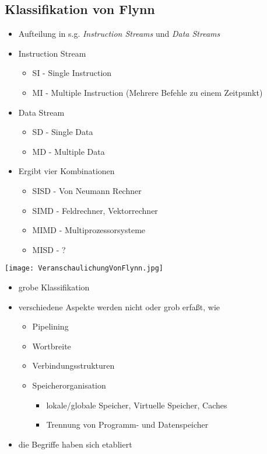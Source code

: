 	\subsection{Klassifikation von Flynn}
		\begin{itemize}
			\item Aufteilung in s.g. \textit{Instruction Streams} und \textit{Data Streams}
			\item Instruction Stream 
				\begin{itemize}
					\item SI - Single Instruction
					\item MI - Multiple Instruction (Mehrere Befehle zu einem Zeitpunkt)
				\end{itemize}
		\end{itemize}
		\begin{minipage}{0.45\textwidth}
			\begin{itemize}
				\item Data Stream
				\begin{itemize}
					\item SD - Single Data
					\item MD - Multiple Data
				\end{itemize}
				\item Ergibt vier Kombinationen
				\begin{itemize}
					\item SISD - Von Neumann Rechner
					\item SIMD - Feldrechner, Vektorrechner
					\item MIMD - Multiprozessorsysteme
					\item MISD - ?
				\end{itemize}
			\end{itemize}
		\end{minipage}
		\begin{minipage}{0.55\textwidth}
			\texttt{[image: VeranschaulichungVonFlynn.jpg]}
		\end{minipage}
		\begin{itemize}
			\item grobe Klassifikation
			\item verschiedene Aspekte werden nicht oder grob erfa\ss t, wie
				\begin{itemize}
					\item Pipelining
					\item Wortbreite
					\item Verbindungsstrukturen
					\item Speicherorganisation
						\begin{itemize}
							\item lokale/globale Speicher, Virtuelle Speicher, Caches
							\item Trennung von Programm- und Datenspeicher
						\end{itemize}
				\end{itemize}
			\item die Begriffe haben sich etabliert
		\end{itemize}


